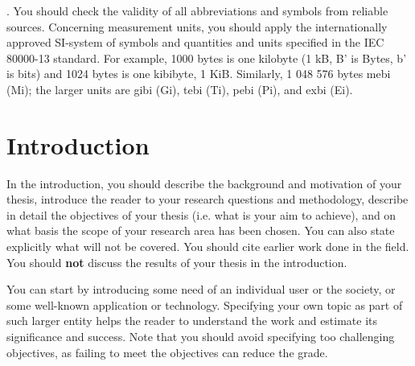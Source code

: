 \DIFdelbegin {}\DIFdelend \DIFaddbegin {}\DIFaddend . You should check the validity
of all abbreviations and symbols from \DIFaddbegin {}\DIFaddend reliable
sources. Concerning measurement units, you should apply the
internationally approved SI-system of symbols\DIFaddbegin \DIFadd{~}\DIFaddend \cite{siopas,
systemofunits} and quantities and units specified in the IEC 80000-13
standard. For example, 1000 bytes is one kilobyte (1 kB, \DIFdelbegin {}\DIFdelend \DIFaddbegin {}\DIFaddend B' is Bytes,
\DIFdelbegin {}\DIFdelend \DIFaddbegin {}\DIFaddend b' is bits) and 1024 bytes is one kibibyte, 1 KiB. Similarly, 1 048
576 bytes mebi (Mi); the larger units are gibi (Gi), tebi (Ti), pebi
(Pi), and exbi (Ei).

\DIFaddbegin {}

\DIFaddend \section{Introduction}

In the introduction, you should describe the background and motivation of your thesis, introduce the reader to your research questions and methodology, describe in detail the objectives of your thesis (i.e. what is your aim to achieve), and on what basis the scope of your research area has been chosen. You can also state explicitly what will not be covered. You should cite earlier work done in the field. You should \textbf{not} discuss the results of your thesis in the introduction.

You can start by introducing some need of an individual user or the society, or some well-known application or technology. Specifying your own topic as part of such larger entity helps the reader to understand the work and estimate its significance and success. Note that you should avoid specifying too challenging objectives, as failing to meet the objectives can reduce the grade.

